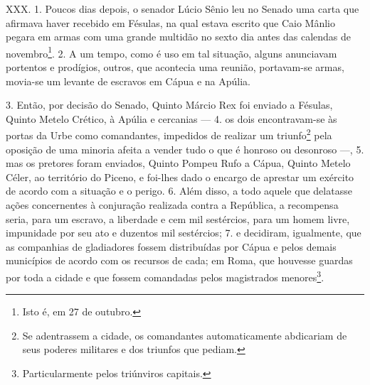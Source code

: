 XXX. 1. Poucos dias depois, o senador Lúcio Sênio leu no Senado uma carta que
afirmava haver recebido em Fésulas, na qual estava escrito que Caio Mânlio
pegara em armas com uma grande multidão no sexto dia antes das calendas de
novembro\footnote{Isto é, em 27 de outubro.}. 2. A um tempo, como é uso em tal
situação, alguns anunciavam portentos e prodígios, outros, que acontecia uma
reunião, portavam-se armas, movia-se um levante de escravos em Cápua e na
Apúlia.

3. Então, por decisão do Senado, Quinto Márcio Rex foi enviado a Fésulas,
Quinto Metelo Crético, à Apúlia e cercanias --- 4. os dois encontravam-se às
portas da Urbe como comandantes, impedidos de realizar um triunfo\footnote{Se
adentrassem a cidade, os comandantes automaticamente abdicariam de seus poderes
militares e dos triunfos que pediam.} pela oposição de uma minoria afeita a
vender tudo o que é honroso ou desonroso ---, 5. mas os pretores foram
enviados, Quinto Pompeu Rufo a Cápua, Quinto Metelo Céler, ao território do Piceno,
e foi-lhes dado o encargo de aprestar um exército de acordo com a situação e o
perigo. 6. Além disso, a todo aquele que delatasse ações concernentes à
conjuração realizada contra a República, a recompensa seria, para um escravo, a
liberdade e cem mil sestércios, para um homem livre, impunidade por seu ato e
duzentos mil sestércios; 7. e decidiram, igualmente, que as companhias de
gladiadores fossem distribuídas por Cápua e pelos demais municípios de acordo
com os recursos de cada; em Roma, que houvesse guardas por toda a cidade e que
fossem comandadas pelos magistrados menores\footnote{Particularmente pelos
triúnviros capitais.}.

